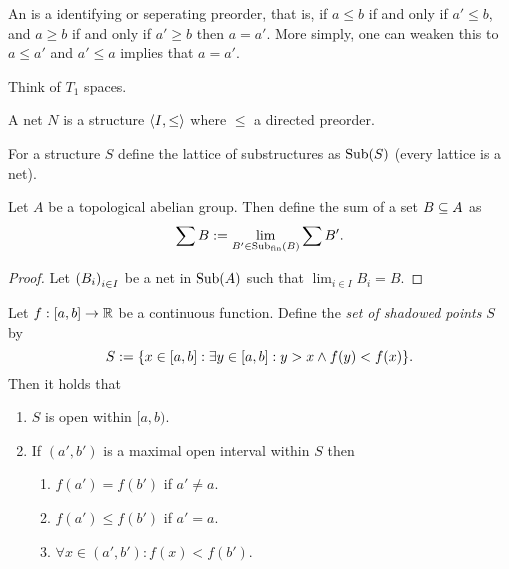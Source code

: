 \documentclass[8pt,a4paper]{article}
\begin{document}
\begin{definition}[order]
    An  is a identifying or seperating preorder, that is, if $a\leq b$ if and only if $a'\leq b$, and $a\geq b$ if and only if $a'\geq b$ then $a=a'$. More simply, one can weaken this to $a\leq a'$ and $a'\leq a$ implies that $a=a'$.
\end{definition}

\begin{remark}
    Think of $T_1$ spaces.
\end{remark}


\begin{definition}[net]
    A net $N$ is a structure $\struct{I,\leq}$ where $\leq$ a directed preorder.
\end{definition}



\begin{definition}[substructures]
    For a structure $S$ define the lattice of substructures as $\mathop\mathrm{Sub}\nolimits(S)$ (every lattice is a net).
\end{definition}


\begin{definition}
    Let $A$ be a topological abelian group. Then define the sum of a set $B\subseteq A$ as
    $$
    \sum{B}:=\lim_{B'\in\mathop\mathrm{Sub}\nolimits_{\mathrm{fin}}(B)}{\sum{B'}}.
    $$
\end{definition}

\begin{lemma}
    
\end{lemma}

\begin{proof}
    Let $\net[i\in I]{B_i}$ be a net in $\mathop\mathrm{Sub}\nolimits(A)$ such that $\lim_{i\in I}{B_i}=B$.
\end{proof}




\begin{lemma}
Let $f:[a,b]\rightarrow\mathbb{R}$ be a continuous function. Define the \emph{set
of shadowed points} $S$ by
\begin{equation}
S:=\{x\in [a,b]:\exists y\in[a,b]:y>x\wedge f(y)<f(x)\}\textrm{.}
\end{equation}
Then it holds that
\begin{enumerate}
\item $S$ is open within $[a,b)$. 
\item If $(a',b')$ is a maximal open interval within $S$ then 
\begin{enumerate}
\item$f(a')=f(b')$ if $a'\neq a$.
\item $f(a')\leq f(b')$ if $a'=a$.
\item $\forall x\in(a',b'):f(x)<f(b')$. 
\end{enumerate}
\end{enumerate}
\end{lemma}
\end{document}
